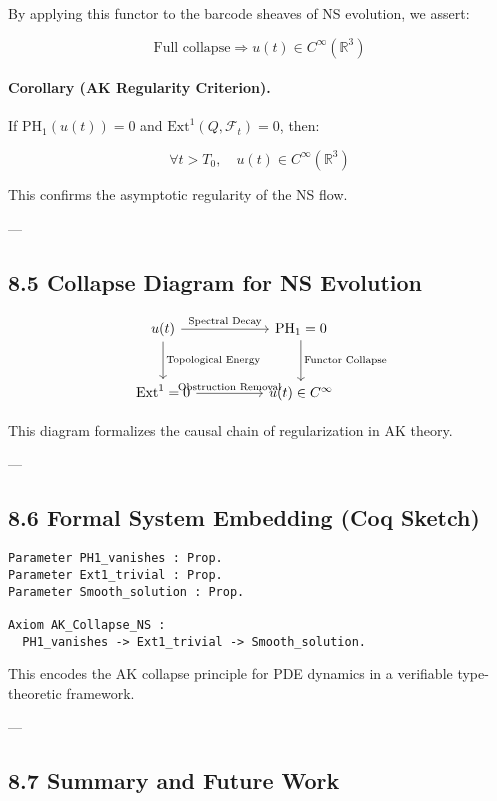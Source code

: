 \documentclass[11pt]{article}
\begin{document}
By applying this functor to the barcode sheaves of NS evolution, we assert:

\[
\text{Full collapse} \Rightarrow u(t) \in C^\infty(\mathbb{R}^3)
\]

\paragraph{Corollary (AK Regularity Criterion).}
If \( \mathrm{PH}_1(u(t)) = 0 \) and \( \mathrm{Ext}^1(Q, \mathcal{F}_t) = 0 \), then:

\[
\forall t > T_0,\quad u(t) \in C^\infty(\mathbb{R}^3)
\]

This confirms the asymptotic regularity of the NS flow.

---

\subsection*{8.5 Collapse Diagram for NS Evolution}

\[
\begin{tikzcd}[row sep=large, column sep=huge]
u(t) \arrow[r, "\text{Spectral Decay}"] \arrow[d, "\text{Topological Energy}"]
& \mathrm{PH}_1 = 0 \arrow[d, "\text{Functor Collapse}"] \\
\mathrm{Ext}^1 = 0 \arrow[r, "\text{Obstruction Removal}"]
& u(t) \in C^\infty
\end{tikzcd}
\]

This diagram formalizes the causal chain of regularization in AK theory.

---

\subsection*{8.6 Formal System Embedding (Coq Sketch)}

\begin{lstlisting}[language=Coq]
Parameter PH1_vanishes : Prop.
Parameter Ext1_trivial : Prop.
Parameter Smooth_solution : Prop.

Axiom AK_Collapse_NS :
  PH1_vanishes -> Ext1_trivial -> Smooth_solution.
\end{lstlisting}

This encodes the AK collapse principle for PDE dynamics in a verifiable type-theoretic framework.

---

\subsection*{8.7 Summary and Future Work}
\end{document}
